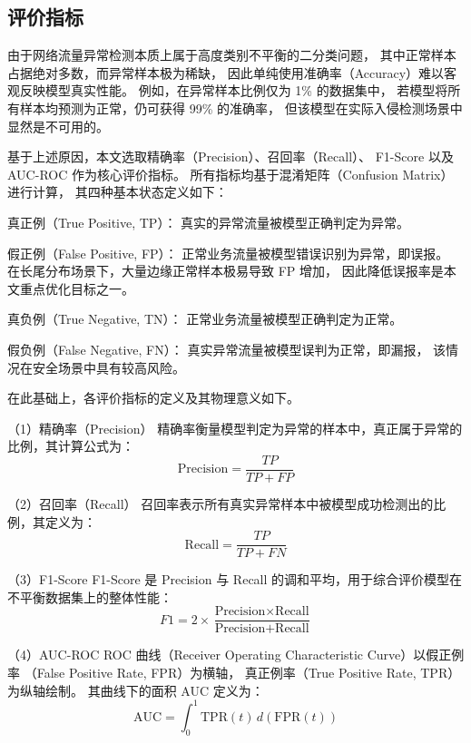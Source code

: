 \subsection{评价指标}
由于网络流量异常检测本质上属于高度类别不平衡的二分类问题，
其中正常样本占据绝对多数，而异常样本极为稀缺，
因此单纯使用准确率（Accuracy）难以客观反映模型真实性能。
例如，在异常样本比例仅为 1\% 的数据集中，
若模型将所有样本均预测为正常，仍可获得 99\% 的准确率，
但该模型在实际入侵检测场景中显然是不可用的。

基于上述原因，本文选取精确率（Precision）、召回率（Recall）、
F1-Score 以及 AUC-ROC 作为核心评价指标。
所有指标均基于混淆矩阵（Confusion Matrix）进行计算，
其四种基本状态定义如下：

真正例（True Positive, TP）：  
真实的异常流量被模型正确判定为异常。

假正例（False Positive, FP）：  
正常业务流量被模型错误识别为异常，即误报。
在长尾分布场景下，大量边缘正常样本极易导致 FP 增加，
因此降低误报率是本文重点优化目标之一。

真负例（True Negative, TN）：  
正常业务流量被模型正确判定为正常。

假负例（False Negative, FN）：  
真实异常流量被模型误判为正常，即漏报，
该情况在安全场景中具有较高风险。

在此基础上，各评价指标的定义及其物理意义如下。

（1）精确率（Precision）
精确率衡量模型判定为异常的样本中，真正属于异常的比例，其计算公式为：
\begin{equation}
\text{Precision} = \frac{TP}{TP + FP}
\end{equation}

（2）召回率（Recall）
召回率表示所有真实异常样本中被模型成功检测出的比例，其定义为：
\begin{equation}
\text{Recall} = \frac{TP}{TP + FN}
\end{equation}


（3）F1-Score
F1-Score 是 Precision 与 Recall 的调和平均，用于综合评价模型在不平衡数据集上的整体性能：
\begin{equation}
F1 = 2 \times \frac{\text{Precision} \times \text{Recall}}
{\text{Precision} + \text{Recall}}
\end{equation}


（4）AUC-ROC
ROC 曲线（Receiver Operating Characteristic Curve）以假正例率
（False Positive Rate, FPR）为横轴，
真正例率（True Positive Rate, TPR）为纵轴绘制。
其曲线下的面积 AUC 定义为：
\begin{equation}
\text{AUC} = \int_{0}^{1} \text{TPR}(t)\, d(\text{FPR}(t))
\end{equation}

